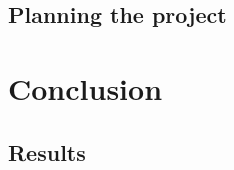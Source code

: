 \documentclass[UKenglish]{ifimaster}  %
\begin{document}
\chapter{Planning the project}        %


\part{Conclusion}                     %

\chapter{Results}                     %


\backmatter{}
\printbibliography
\end{document}
